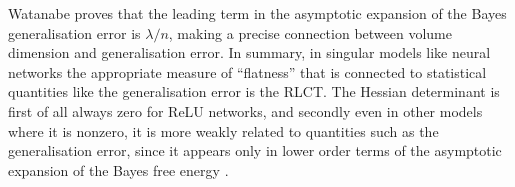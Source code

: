 \documentclass{article} %
\begin{document}
Watanabe proves that the leading term in the asymptotic expansion of the Bayes generalisation error is $\lambda/n$, making a precise connection between volume dimension and generalisation error. In summary, in singular models like neural networks the appropriate measure of ``flatness'' that is connected to statistical quantities like the generalisation error is the RLCT. The Hessian determinant is first of all always zero for ReLU networks, and secondly even in other models where it is nonzero, it is more weakly related to quantities such as the generalisation error, since it appears only in lower order terms of the asymptotic expansion of the Bayes free energy \citep[\S 3.1]{Balasubramanian:1996cond.mat..1030B}. 

\end{document}
